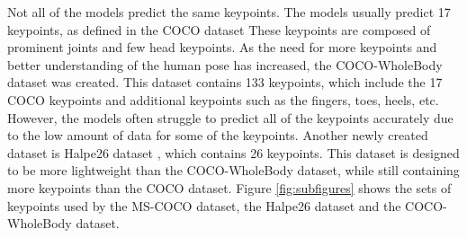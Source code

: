 Not all of the models predict the same keypoints. The models usually predict 17 keypoints, as defined in the COCO dataset \cite{coco} These keypoints are composed of prominent joints and few head keypoints. As the need for more keypoints and better understanding of the human pose has increased, the COCO-WholeBody dataset \cite{coco-wholebody} was created. This dataset contains 133 keypoints, which include the 17 COCO keypoints and additional keypoints such as the fingers, toes, heels, etc. However, the models often struggle to predict all of the keypoints accurately due to the low amount of data for some of the keypoints. Another newly created dataset is Halpe26 dataset \cite{halpe}, which contains 26 keypoints. This dataset is designed to be more lightweight than the COCO-WholeBody dataset, while still containing more keypoints than the COCO dataset. Figure \ref{fig:subfigures} shows the sets of keypoints used by the MS-COCO dataset, the Halpe26 dataset and the COCO-WholeBody dataset.


